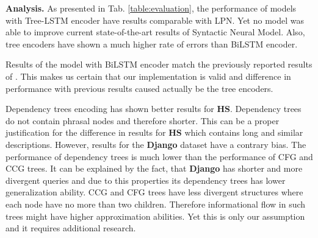 \textbf{Analysis.} As presented in Tab. \ref{table:evaluation}, the performance of models with Tree-LSTM encoder have results comparable with LPN. Yet no model was able to improve current state-of-the-art results of Syntactic Neural Model. Also, tree encoders have shown a much higher rate of errors than BiLSTM encoder.

Results of the model with BiLSTM encoder match the previously reported results of \cite{Yin2017}. This makes us certain that our implementation is valid and difference in performance with previous results caused actually be the tree encoders.

Dependency trees encoding has shown better results for \textbf{HS}. Dependency trees do not contain phrasal nodes and therefore shorter. This can be a proper justification for the difference in results for \textbf{HS} which contains long and similar descriptions. However, results for the \textbf{Django} dataset  have a contrary bias. The performance of dependency trees is much lower than the performance of CFG and CCG trees. It can be explained by the fact, that \textbf{Django} has shorter and more divergent queries and due to this properties its dependency trees has lower generalization ability. CCG and CFG trees have less divergent structures where each node have no more than two children. Therefore informational flow in such trees might have higher approximation abilities. Yet this is only our assumption and it requires additional research.




